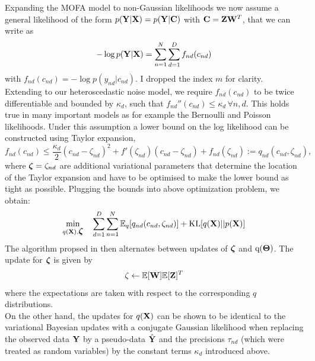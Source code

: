 Expanding the MOFA model to non-Gaussian likelihoods we now assume a general likelihood of the form $p({\bf Y}|{\bf X})=p({\bf Y}|{\bf C})$ with ${\bf C} = {\bf Z}{\bf W}^{T}$, that we can write as
\begin{equation*}
-\log p({\bf Y}|{\bf X}) = \sum_{n=1}^{N} \sum_{d=1}^{D} f_{nd} (c_{nd})
\end{equation*}
with $f_{nd}(c_{nd}) = -\log p(y_{nd}|c_{nd})$. I dropped the index $m$ for clarity.\\
Extending \cite{Seeger2012} to our heteroscedastic noise model, we require $f_{nd}(c_{nd})$ to be twice differentiable and bounded by $\kappa_d$, such that $f_{nd}''(c_{nd}) \leq \kappa_d \,\forall n,d$. This holds true in many important models as for example the Bernoulli and Poisson likelihoods. Under this assumption a lower bound on the log likelihood can be constructed using Taylor expansion,
\begin{equation*}
f_{nd}(c_{nd}) \leq \frac{\kappa_d}{2} (c_{nd} - \zeta_{nd})^2 + f'(\zeta_{nd})(c_{nd} - \zeta_{nd}) + f_{nd}(\zeta_{nd}) := q_{nd}(c_{nd},\zeta_{nd}),
\end{equation*}
where $\mbox{\boldmath $\zeta$} =  \zeta_{nd} $ are additional variational parameters that determine the location of the Taylor expansion and have to be optimised to make the lower bound as tight as possible. Plugging the bounds into above optimization problem, we obtain:
\begin{equation*}
\min_{q({\bf X}),\mbox{\boldmath $\zeta$}} \quad \sum_{d=1}^{D}\sum_{n=1}^{N} \mathbb{E}_q [ q_{nd}(c_{nd},\zeta_{nd})] + {\rm KL}[q({\bf X})||p({\bf X})]
\end{equation*}
The algorithm propsed in \cite{Seeger2012} then alternates between updates of $\mbox{\boldmath $\zeta$}$ and $\mathrm{q}(\mbox{\boldmath $\Theta$})$. The update for $\mbox{\boldmath $\zeta$}$ is given by
\begin{equation*}
\zeta \leftarrow \mathbb{E}[{\bf W}]\mathbb{E}[{\bf Z}]^{T}
\end{equation*}
where the expectations are taken with respect to the corresponding $q$ distributions.\\
On the other hand, the updates for $q({\bf X})$ can be shown to be identical to the variational Bayesian updates with a conjugate Gaussian likelihood when replacing the observed data ${\bf Y}$ by a pseudo-data $\hat{{\bf Y}}$ and the precisions $\tau_{nd}$ (which were treated as random variables) by the constant terms $\kappa_d$ introduced above. 

